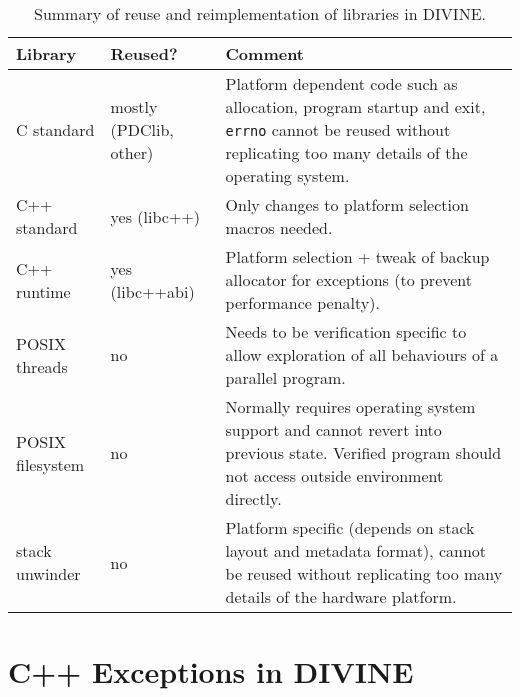 \begin{table}[t]
  \begin{tabularx}{\textwidth}{>{\raggedright}p{5.5em}p{5.5em}L}
      \toprule
      Library    & Reused? & Comment \\\midrule\midrule
      C standard & mostly (\mbox{PDClib}, other) & Platform dependent code such as allocation, program startup and exit, \texttt{errno} cannot be reused without replicating too many details of the operating system. \\\midrule
      C++ standard & yes (libc++) & Only changes to platform selection macros needed. \\\midrule
      C++ runtime  & yes (libc++abi) & Platform selection + tweak of backup allocator for exceptions (to prevent performance penalty). \\\midrule
      POSIX threads & no & Needs to be verification specific to allow exploration of all behaviours of a parallel program. \\\midrule
      POSIX filesystem & no & Normally requires operating system support and cannot revert into previous state. Verified program should not access outside environment directly. \\\midrule
      stack unwinder & no & Platform specific (depends on stack layout and metadata format), cannot be reused without replicating too many details of the hardware platform. \\
      \bottomrule
  \end{tabularx}
  \caption{Summary of reuse and reimplementation of libraries in DIVINE.}\label{tab:lang:reuse}
\end{table}

\section{C++ Exceptions in DIVINE}\label{sec:lang:except}

